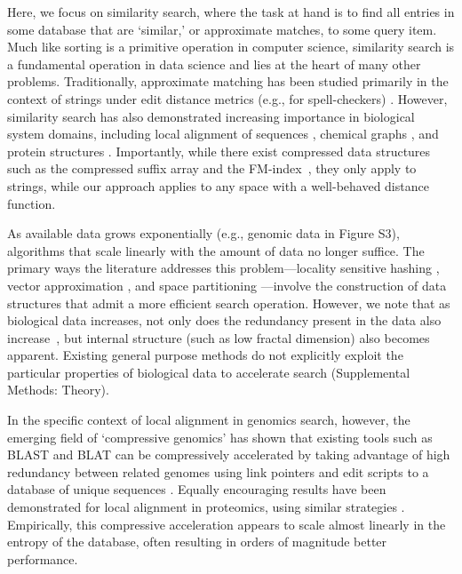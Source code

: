 \documentclass[review,preprint,12pt]{elsarticle}
\renewcommand{\cite}{\citep} %
\theoremstyle{definition}
\theoremstyle{remark}
\numberwithin{equation}{section}
\begin{document}
Here, we focus on similarity search, where the task at hand is to find all entries in some database that are `similar,' or approximate matches, to some query item.
Much like sorting is a primitive operation in computer science, similarity search is a fundamental operation in data science and lies at the heart of many other problems.
Traditionally, approximate matching has been studied primarily in the context of strings under edit distance metrics (e.g., for spell-checkers) \cite{ukkonen1985algorithms}.
However, similarity search has also demonstrated increasing importance in biological system domains, including local alignment of sequences \cite{altschul1990basic, kent2002blat}, chemical graphs \cite{schaeffer2007graph}, and protein structures \cite{budowski2010fragbag}.
Importantly, while there exist compressed data structures such as the 
compressed suffix array and the FM-index~\cite{grossi2005compressed, ferragina2000opportunistic}, they only apply to strings, while our approach 
applies to any space with a well-behaved distance function.

As available data grows exponentially \cite{berger2013computational,yu2015quality} (e.g., genomic data in Figure S3), 
algorithms that scale linearly with the amount of data no longer suffice.
The primary ways the literature addresses this problem---locality sensitive 
hashing \cite{indyk1998approximate}, vector approximation 
\cite{ferhatosmanoglu2000vector}, and space partitioning 
\cite{weber1998quantitative}---involve the construction of data structures that admit a more efficient search operation.
However, we note that as biological data increases, not only does the redundancy present in the data also increase~\cite{loh2012compressive}, but 
internal structure (such as low fractal dimension) also becomes apparent.
Existing general purpose methods do not explicitly exploit the particular 
properties of biological data to accelerate search (Supplemental Methods: 
Theory).

In the specific context of local alignment in genomics search, however, the emerging field of `compressive genomics' has shown that existing tools such as BLAST and BLAT can be compressively accelerated by taking advantage of high redundancy between related genomes using link pointers and edit scripts to a database of unique sequences \cite{loh2012compressive}.
Equally encouraging results have been demonstrated for local alignment in 
proteomics, using similar strategies \cite{daniels2013compressive}.
Empirically, this compressive acceleration appears to scale almost linearly in the entropy of the database, often resulting in orders of magnitude better performance.
\end{document}
